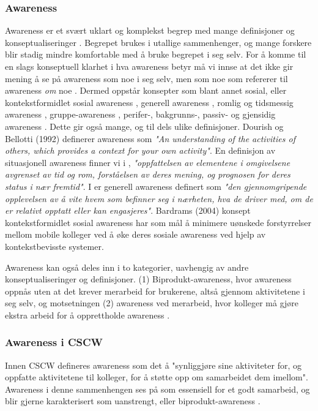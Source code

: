\subsubsection{Awareness}
Awareness er et svært uklart og komplekst begrep med mange definisjoner og konseptualiseringer \cite{KlemetsRedundancy, Gutwin04, Schmidt02}. Begrepet brukes i utallige sammenhenger, og mange forskere blir stadig mindre komfortable med å bruke begrepet i seg selv. For å komme til en slags konseptuell klarhet i hva awareness betyr må vi innse at det ikke gir mening å se på awareness som noe i seg selv, men som noe som refererer til awareness \emph{om} noe \cite{Schmidt02}. Dermed oppstår konsepter som blant annet sosial, eller kontekstformidlet sosial awareness \cite{Bardram04}, generell awareness \cite{Gross13}, romlig og tidsmessig awareness \cite{Randell}, gruppe-awareness \cite{Gutwin04}, perifer-, bakgrunns-, passiv- og gjensidig awareness \cite{Schmidt02}. Dette gir også mange, og til dels ulike definisjoner. Dourish og Bellotti (1992) definerer awareness som \emph{"An understanding of the activities of others, which provides a context for your own activity"}. En definisjon av situasjonell awareness finner vi i \cite{Endsly95}, \emph{"oppfattelsen av elementene i omgivelsene avgrenset av tid og rom, forståelsen av deres mening, og prognosen for deres status i nær fremtid"}. I \cite{Gross13} er generell awareness definert som \emph{"den gjennomgripende opplevelsen av å vite hvem som befinner seg i nærheten, hva de driver med, om de er relativt opptatt eller kan engasjeres"}. Bardrams (2004) konsept kontekstformidlet sosial awareness har som mål å minimere uønskede forstyrrelser mellom mobile kolleger ved å øke deres sosiale awareness ved hjelp av kontekstbevisste systemer. 

\noindent
Awareness kan også deles inn i to kategorier, uavhengig av andre konseptualiseringer og definisjoner. (1) Biprodukt-awareness, hvor awareness oppnås uten at det krever merarbeid for brukerene, altså gjennom aktivitetene i seg selv, og motsetningen (2) awareness ved merarbeid, hvor kolleger må gjøre ekstra arbeid for å opprettholde awareness \cite{Randell}. 


\subsubsection{Awareness i CSCW}
Innen CSCW defineres awareness som det å "synliggjøre sine aktiviteter for, og oppfatte aktivitetene til kolleger, for å støtte opp om samarbeidet dem imellom". Awareness i denne sammenhengen ses på som essensiell for et godt samarbeid, og blir gjerne karakterisert som uanstrengt, eller biprodukt-awareness \cite{Randell}. 

